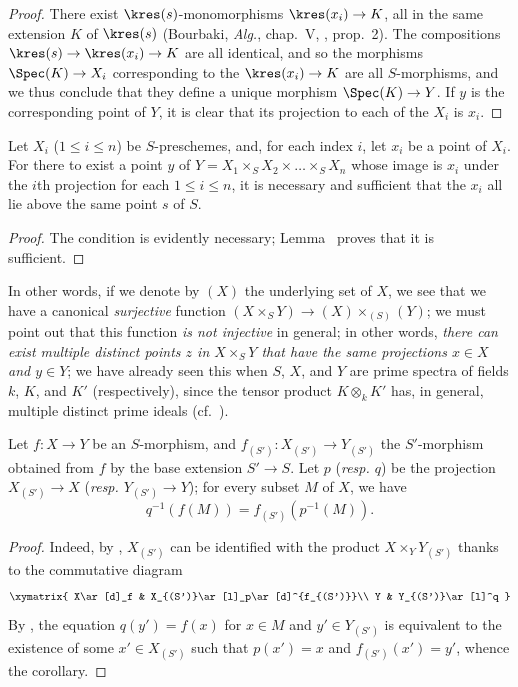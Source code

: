 \begin{proof}
There exist $\kres(s)$-monomorphisms $\kres(x_i)\to K$, all in the same extension $K$ of $\kres(s)$ (Bourbaki, \emph{Alg.}, chap.~V, , prop.~2).
The compositions $\kres(s)\to\kres(x_i)\to K$ are all identical, and so the morphisms $\Spec(K)\to X_i$ corresponding to the $\kres(x_i)\to K$ are all $S$-morphisms, and we thus conclude that they define a unique morphism $\Spec(K)\to Y$.
If $y$ is the corresponding point of $Y$, it is clear that its projection to each of the $X_i$ is $x_i$.
\end{proof}

\begin{proposition}[3.4.7]
\label{I.3.4.7}
Let $X_i$ ($1\leq i\leq n$) be $S$-preschemes, and, for each index $i$, let $x_i$ be a point of $X_i$.
For there to exist a point $y$ of $Y=X_1\times_S X_2\times\ldots\times_S X_n$ whose image is $x_i$ under the $i$th projection for each $1\leq i\leq n$, it is necessary and sufficient that the $x_i$ all lie above the same point $s$ of $S$.
\end{proposition}

\begin{proof}
The condition is evidently necessary; Lemma~ proves that it is sufficient.
\end{proof}

In other words, if we denote by $(X)$ the underlying set of $X$, we see that we have a canonical \emph{surjective} function $(X\times_S Y)\to(X)\times_{(S)}(Y)$; we must point out that this function \emph{is not injective} in general; in other words, \emph{there can exist multiple distinct points $z$ in $X\times_S Y$ that have the same projections $x\in X$ and $y\in Y$}; we have already seen this when $S$, $X$, and $Y$ are prime spectra of fields $k$, $K$, and $K'$ (respectively), since the tensor product $K\otimes_k K'$ has, in general, multiple distinct prime ideals (cf.~).

\begin{corollary}[3.4.8]
\label{I.3.4.8}
Let $f:X\to Y$ be an $S$-morphism, and $f_{(S')}:X_{(S')}\to Y_{(S')}$ the $S'$-morphism obtained from $f$ by the base extension $S'\to S$.
Let $p$ (\emph{resp. $q$}) be the projection $X_{(S')}\to X$ (\emph{resp. $Y_{(S')}\to Y$}); for every subset $M$ of $X$, we have
\[
  q^{-1}(f(M))=f_{(S')}(p^{-1}(M)).
\]
\end{corollary}

\begin{proof}
Indeed, by , $X_{(S')}$ can be identified with the product $X\times_Y Y_{(S')}$ thanks to the commutative diagram
\[
  \xymatrix{
    X\ar[d]_f &
    X_{(S')}\ar[l]_p\ar[d]^{f_{(S')}}\\
    Y &
    Y_{(S')}\ar[l]^q
  }
\]
By , the equation $q(y')=f(x)$ for $x\in M$ and $y'\in Y_{(S')}$ is equivalent to the existence of some $x'\in X_{(S')}$ such that $p(x')=x$ and $f_{(S')}(x')=y'$, whence the corollary.
\end{proof}

